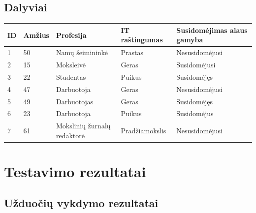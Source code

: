 \documentclass[oneside]{VUMIFPSkursinis}
\begin{document}
	\subsection{Dalyviai}
\begin{center}
    \begin{tabular}{ |p{1cm} | p{2cm} | p{4cm} | p{4cm} | p{4cm} |}
    \hline
	ID&Amžius&Profesija&IT raštingumas&Susidomėjimas alaus gamyba\\ \hline
	1&50&Namų šeimininkė&Prastas&Nesusidomėjusi \\ \hline
	2&15&Moksleivė&Geras&Susidomėjusi \\ \hline
	3&22&Studentas&Puikus&Susidomėjęs \\ \hline
	4&47&Darbuotoja&Geras&Nesusidomėjusi \\ \hline
	5&49&Darbuotojas&Geras&Susidomėjęs \\ \hline
	6&23&Darbuotoja&Puikus&Susidomėjus \\ \hline
	7&61&Mokslinių žurnalų redaktorė&Pradžiamokslis&Nesusidomėjusi \\ \hline
   \hline
    \end{tabular}
\end{center}



\section{Testavimo rezultatai}
	\subsection{Užduočių vykdymo rezultatai}
\end{document}
